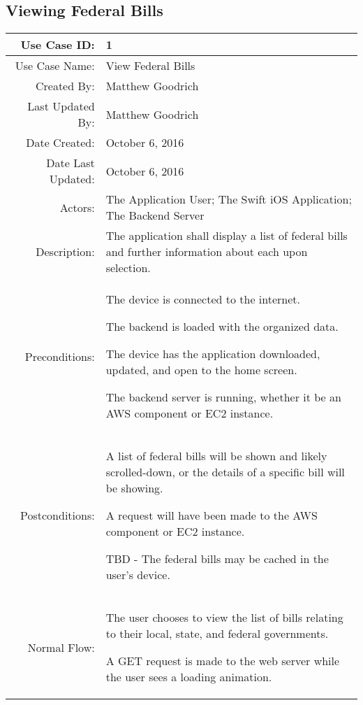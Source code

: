 \documentclass[11pt,oneside,letterpaper]{article}   	%
\newenvironment{packed_enumerate}{ %
\vspace{-7mm}
\begin{enumerate}
  \setlength{\itemsep}{0pt}
  \setlength{\parskip}{0pt}
  \setlength{\parsep}{0pt}
}{\end{enumerate}
\vspace{-8mm}}
\begin{document}
\subsection{\label{Sim Data}Viewing Federal Bills}
\begin{longtable}{|r|p{3.8in}|}
\hline
Use Case ID:&1\\
\hline
Use Case Name:&View Federal Bills\\
\hline
Created By:&Matthew Goodrich\\
\hline
Last Updated By:&Matthew Goodrich\\
\hline
Date Created:&October 6, 2016\\
\hline
Date Last Updated:&October 6, 2016\\
\hline
Actors:&The Application User; The Swift iOS Application; The Backend Server\\
\hline
Description:&The application shall display a list of federal bills and further information about each upon selection.\\
\hline
Preconditions:&
\begin{packed_enumerate}
\item The device is connected to the internet.
\item The backend is loaded with the organized data.
\item The device has the application downloaded, updated, and open to the home screen.
\item The backend server is running, whether it be an AWS component or EC2 instance.
\end{packed_enumerate}\\
\hline
Postconditions:&
\begin{packed_enumerate}
\item A list of federal bills will be shown and likely scrolled-down, or the details of a specific bill will be showing.
\item A request will have been made to the AWS component or EC2 instance.
\item TBD - The federal bills may be cached in the user's device.
\end{packed_enumerate}\\
\hline
Normal Flow:&
\begin{packed_enumerate}
\item The user chooses to view the list of bills relating to their local, state, and federal governments.
\item A GET request is made to the web server while the user sees a loading animation.

\end{packed_enumerate}
\end{longtable}
\end{document}
